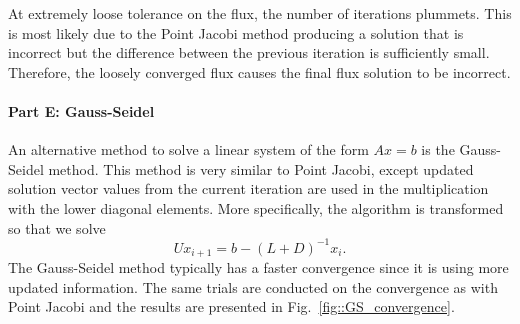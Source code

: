 \documentclass[12pt]{report}
\begin{document}
	At extremely loose tolerance on the flux, the number of iterations plummets. This is most likely due to the Point Jacobi method producing a solution that is incorrect but the difference between the previous iteration is sufficiently small. Therefore, the loosely converged flux causes the final flux solution to be incorrect. 
	
	\paragraph{Part E: Gauss-Seidel}
	An alternative method to solve a linear system of the form $Ax = b$ is the Gauss-Seidel method. This method is very similar to Point Jacobi, except updated solution vector values from the current iteration are used in the multiplication with the lower diagonal elements. More specifically, the algorithm is transformed so that we solve
	\begin{equation}
	Ux_{i+1} = b-(L+D)^{-1} x_i.
	\end{equation}
	The Gauss-Seidel method typically has a faster convergence since it is using more updated information. The same trials are conducted on the convergence as with Point Jacobi and the results are presented in Fig.~\ref{fig::GS_convergence}.
\end{document}
